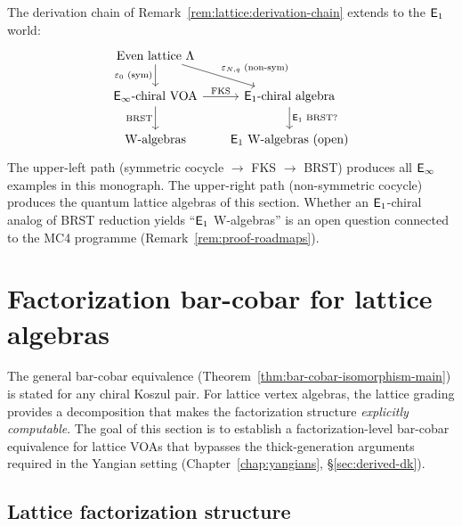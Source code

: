 \begin{remark}\label{rem:e1-derivation-chain}
The derivation chain of Remark~\ref{rem:lattice:derivation-chain}
extends to the $\mathsf{E}_1$ world:
\[
\begin{tikzcd}[column sep=1.8em]
\text{Even lattice } \Lambda
  \arrow[d, "\varepsilon_0 \text{ (sym)}"']
  \arrow[dr, "\varepsilon_{N,q} \text{ (non-sym)}"] \\
\Einf\text{-chiral VOA}
  \arrow[r, "\text{FKS}"]
  \arrow[d, "\text{BRST}"']
  & \Eone\text{-chiral algebra}
  \arrow[d, "\text{\(\Eone\) BRST?}"] \\
\text{W-algebras}
  & \text{$\Eone$ W-algebras (open)}
\end{tikzcd}
\]
The upper-left path (symmetric cocycle $\to$ FKS $\to$ BRST)
produces all $\mathsf{E}_{\infty}$ examples in this monograph.  The upper-right
path (non-symmetric cocycle) produces the quantum lattice algebras
of this section.  Whether an $\mathsf{E}_1$-chiral analog of BRST
reduction yields ``$\mathsf{E}_1$ W-algebras'' is an open question
connected to the MC4 programme
(Remark~\ref{rem:proof-roadmaps}).
\end{remark}



\section{Factorization bar-cobar for lattice algebras}
\label{sec:lattice:factorization-bar-cobar}


The general bar-cobar equivalence
(Theorem~\ref{thm:bar-cobar-isomorphism-main}) is stated for any
chiral Koszul pair.  For lattice vertex algebras, the lattice grading
provides a decomposition that makes the factorization structure
\emph{explicitly computable}.  The goal of this section is to
establish a factorization-level bar-cobar equivalence for lattice
VOAs that bypasses the thick-generation arguments required in the
Yangian setting (Chapter~\ref{chap:yangians},
\S\ref{sec:derived-dk}).

\subsection{Lattice factorization structure}

